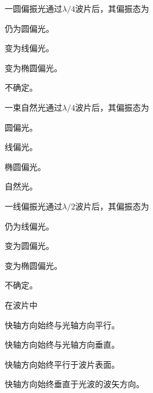 \documentclass[standard, analysis, notocnum]{ExBook}
\newcommand{\answerarea}[1][8cm]{%
  \par\vspace{2mm}%
  \noindent{\color{themeColor!35}\rule{\linewidth}{0.4pt}}\par
  \noindent\begin{minipage}[t][#1][t]{\linewidth}\vspace{0pt}\end{minipage}\par
  \noindent{\color{themeColor!35}\rule{\linewidth}{0.4pt}}\par
}
\begin{document}
\begin{qitems}
\begin{bbox}
\qitem 一圆偏振光通过$\lambda /4$波片后，其偏振态为
\par\noindent\hspace{2em}仍为圆偏光。
\par\noindent\hspace{2em}变为线偏光。
\par\noindent\hspace{2em}变为椭圆偏光。
\par\noindent\hspace{2em}不确定。
\answerarea[3.5cm]
\end{bbox}
\begin{bbox}
\qitem 一束自然光通过$\lambda /4$波片后，其偏振态为
\par\noindent\hspace{2em}圆偏光。
\par\noindent\hspace{2em}线偏光。
\par\noindent\hspace{2em}椭圆偏光。
\par\noindent\hspace{2em}自然光。
\answerarea[3.5cm]
\end{bbox}
\begin{bbox}
\qitem 一线偏振光通过$\lambda /2$波片后，其偏振态为
\par\noindent\hspace{2em}仍为线偏光。
\par\noindent\hspace{2em}变为圆偏光。
\par\noindent\hspace{2em}变为椭圆偏光。
\par\noindent\hspace{2em}不确定。
\answerarea[3.5cm]
\end{bbox}
\begin{bbox}
\qitem 在波片中
\par\noindent\hspace{2em}快轴方向始终与光轴方向平行。
\par\noindent\hspace{2em}快轴方向始终与光轴方向垂直。
\par\noindent\hspace{2em}快轴方向始终平行于波片表面。
\par\noindent\hspace{2em}快轴方向始终垂直于光波的波矢方向。

\end{bbox}
\end{qitems}
\end{document}
